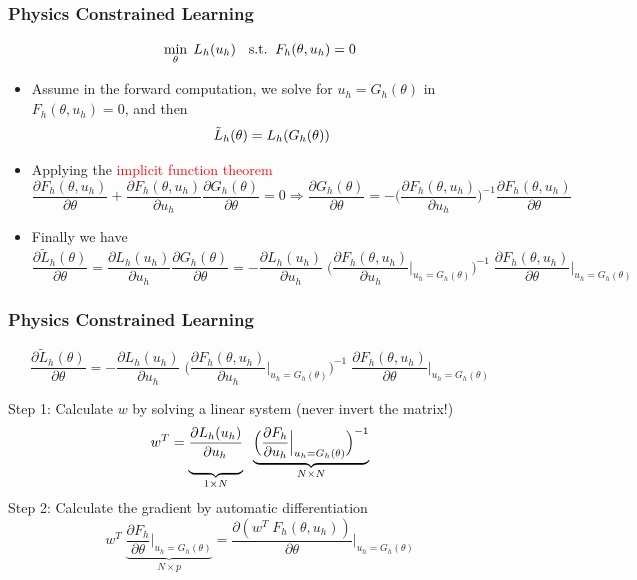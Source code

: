 \documentclass{beamer}
\begin{document}
\begin{frame}
	\frametitle{Physics Constrained Learning}
	 $${\small    \min_{\theta}\; L_h(u_h) \quad \mathrm{s.t.}\;\; F_h(\theta, u_h) = 0}$$
	\begin{itemize}
\item Assume in the forward computation, we solve for $u_h=G_h(\theta)$ in $F_h(\theta, u_h)=0$, and then
$${\small\tilde L_h(\theta)  = L_h(G_h(\theta))}$$
\item Applying the \textcolor{red}{implicit function theorem}
{  \scriptsize
\begin{equation*}
\frac{{\partial {F_h(\theta, u_h)}}}{{\partial \theta }} + {\frac{{\partial {F_h(\theta, u_h)}}}{{\partial {u_h}}}}  \frac{\partial G_h(\theta)}{\partial \theta} = 0  \Rightarrow 
     \frac{\partial G_h(\theta)}{\partial \theta} =  -\Big( \frac{{\partial {F_h(\theta, u_h)}}}{{\partial {u_h}}} \Big)^{ - 1} \frac{{\partial {F_h(\theta, u_h)}}}{{\partial \theta }}
\end{equation*}
}
\item Finally we have
{\scriptsize
\begin{equation*}
    \boxed{\frac{{\partial {{\tilde L}_h}(\theta )}}{{\partial \theta }} 
    = \frac{\partial {{ L}_h}(u_h )}{\partial u_h}\frac{\partial G_h(\theta)}{\partial \theta}= - \frac{{\partial {L_h}({u_h})}}{{\partial {u_h}}} \;
    \Big( {\frac{{\partial {F_h(\theta, u_h)}}}{{\partial {u_h}}}\Big|_{u_h = {G_h}(\theta )}} \Big)^{ - 1} \;
    \frac{{\partial {F_h(\theta, u_h)}}}{{\partial \theta }}\Big|_{u_h = {G_h}(\theta )}}
\end{equation*}
}

	\end{itemize}
	
\end{frame}



\begin{frame}
	\frametitle{Physics Constrained Learning}	
	{\scriptsize$$\boxed{\frac{{\partial {{\tilde L}_h}(\theta )}}{{\partial \theta }} 
    = - \frac{{\partial {L_h}({u_h})}}{{\partial {u_h}}} \;
    \Big( {\frac{{\partial {F_h(\theta, u_h)}}}{{\partial {u_h}}}\Big|_{u_h = {G_h}(\theta )}} \Big)^{ - 1} \;
    \frac{{\partial {F_h(\theta, u_h)}}}{{\partial \theta }}\Big|_{u_h = {G_h}(\theta )}}$$}

		Step 1: Calculate $w$ by solving a linear system (never invert the matrix!)
{\scriptsize$$w^T = \underbrace{\frac{{\partial {L_h}({u_h})}}{{\partial {u_h}}\rule[-9pt]{1pt}{0pt}}}_{1\times N} 
        \;\;
        \underbrace{\Big( {\frac{{\partial {F_h}}}{{\partial {u_h}}}\Big|_{u_h = {G_h}(\theta )}} \Big)^{ - 1}}_{N\times N}$$}
Step 2: Calculate the gradient by automatic differentiation 
{\scriptsize$$w^T\;\underbrace{\frac{{\partial {F_h}}}{{\partial \theta }}\Big|_{u_h = {G_h}(\theta )}}_{N\times p} = \frac{\partial (w^T\;  {F_h}(\theta, u_h))}{\partial \theta }\Bigg|_{u_h = {G_h}(\theta )}$$}
	
\end{frame}
\end{document}
